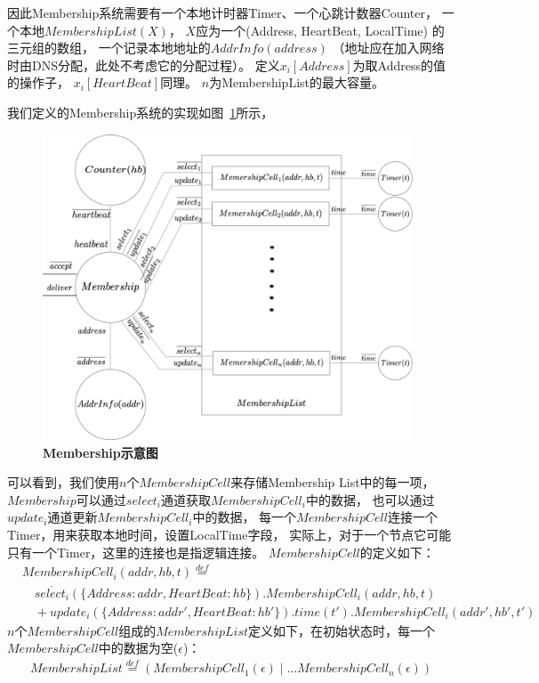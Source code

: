 因此Membership系统需要有一个本地计时器Timer、一个心跳计数器Counter，
一个本地$MembershipList(X)$，
$X$应为一个(Address, HeartBeat, LocalTime)
的三元组的数组，
一个记录本地地址的$AddrInfo(address)$
（地址应在加入网络时由DNS分配，此处不考虑它的分配过程）。
定义$x_i[Address]$为取Address的值的操作子，
$x_i[HeartBeat]$同理。
$n$为MembershipList的最大容量。

我们定义的Membership系统的实现如图~\ref{fig:membership_system}所示，
\begin{figure}[!htbp]
	\small
	\centering
	\includegraphics[width=11cm]{../figure/membership.png}
    \caption{\textbf{Membership示意图}}
    \label{fig:membership_system}
\end{figure}
可以看到，我们使用$n$个$MembershipCell$来存储Membership List中的每一项，
$Membership$可以通过$select_i$通道获取$MembershipCell_i$中的数据，
也可以通过$update_i$通道更新$MembershipCell_i$中的数据，
每一个$MembershipCell$连接一个Timer，用来获取本地时间，设置LocalTime字段，
实际上，对于一个节点它可能只有一个Timer，这里的连接也是指逻辑连接。
$MembershipCell$的定义如下：
\begin{align*}
   &MembershipCell_i(addr,hb,t)\stackrel{def}{=}\\
   &\quad\overline{select_i}(\{Address:addr,HeartBeat:hb\}).MembershipCell_i(addr,hb,t)\\
   &\quad+update_i(\{Address:addr',HeartBeat:hb'\}).time(t').MembershipCell_i(addr',hb',t')
\end{align*}
$n$个$MembershipCell$组成的$MembershipList$定义如下，在初始状态时，每一个$MembershipCell$中的数据为空($\epsilon$)：
\begin{align*}
   MembershipList\stackrel{def}{=}(MembershipCell_1(\epsilon)\mid \dots MembershipCell_n(\epsilon))
\end{align*}


